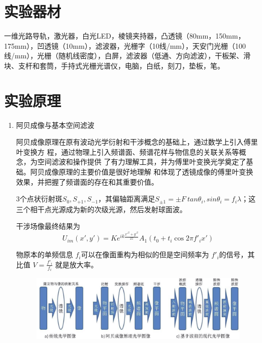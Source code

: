 \documentclass[11pt]{article}
\begin{document}
\section{实验器材}

    一维光路导轨，激光器，白光LED，棱镜夹持器，凸透镜（80mm，150mm，175mm），凹透镜（10mm），滤波器，光栅字（10线/mm），天安门光栅（100线/mm），光栅（随机线密度），白屏，滤波器（低通、方向滤波），干板架、滑块、支杆和套筒，手持式光栅光谱仪，电脑，白纸，刻刀，垫板，笔。

\section{实验原理}
\begin{enumerate}
    \item 阿贝成像与基本空间滤波
    \par \hspace*{2em}  阿贝成像原理在原有波动光学衍射和干涉概念的基础上，通过数学上引入傅里叶变换方
    程，通过物理上引入频谱面、频谱花样与物信息的关联关系等概念，为空间滤波和操作提供
    了有力理解工具，并为傅里叶变换光学奠定了基础。阿贝成像原理的主要价值是很好地理解
    和体现了透镜成像的傅里叶变换效果，并把握了频谱面的存在和其重要价值。
    \par \hspace*{2em} 3个点状衍射斑$S_0,S_{+1},S_{-1}$，其偏轴距离满足$S_{\pm1}=\pm F\ tan\theta_i,sin\theta_i=f_i\lambda$；这三个相干点光源成为新的次级光源，然后发射球面波。
    \par \hspace*{2em} 干涉场像最终结果为
    \begin{equation}
        U_{im}\left(x',y'\right)=Ke^{ik\frac{{x'}^2+{y'}^2}{2z}}A_1\left(t_0+t_i\cos2\pi {f'}_ix'\right)
    \end{equation}
    \par \hspace*{2em} 物原本的单频信息 $f_i$可以在像面重构为相似的但是空间频率为 ${f'}_i$的信号，其比值 $V=\frac{{f'}_i}{f_i}$ 就是放大率。
    \begin{figure}[H]
        \centering
        \includegraphics[width=14cm]{Fig/1.png}

\end{figure}
\end{enumerate}
\end{document}
